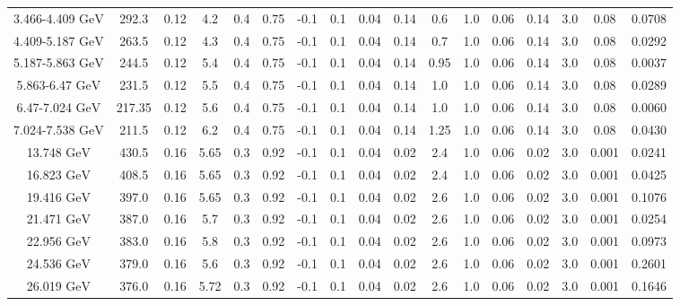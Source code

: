 \documentclass[11pt]{article}
\begin{document}
\begin{table}[htbp]
{\begin{tabular}{ccccccccccccccccc}
				\midrule
				3.466-4.409 ${\textrm{GeV}}$ & 292.3 & 0.12 & 4.2 & 0.4 & 0.75 & -0.1 & 0.1 & 0.04 & 0.14 & 0.6 & 1.0  & 0.06 & 0.14 & 3.0 & 0.08 & 0.0708 \\
				4.409-5.187 ${\textrm{GeV}}$ & 263.5 & 0.12 & 4.3 & 0.4 & 0.75 & -0.1 & 0.1 & 0.04 & 0.14 & 0.7 & 1.0  & 0.06 & 0.14 & 3.0 & 0.08 & 0.0292 \\
				5.187-5.863 ${\textrm{GeV}}$ & 244.5 & 0.12 & 5.4 & 0.4 & 0.75 & -0.1 & 0.1 & 0.04 & 0.14 & 0.95 & 1.0 & 0.06 & 0.14 & 3.0 & 0.08 & 0.0037 \\
				5.863-6.47 ${\textrm{GeV}}$ & 231.5 & 0.12 & 5.5 & 0.4 & 0.75 & -0.1 & 0.1 & 0.04 & 0.14 & 1.0 & 1.0 & 0.06 & 0.14 & 3.0 & 0.08 & 0.0289 \\
				6.47-7.024 ${\textrm{GeV}}$ & 217.35 & 0.12 & 5.6 & 0.4 & 0.75 & -0.1 & 0.1 & 0.04 & 0.14 & 1.0 & 1.0 & 0.06 & 0.14 & 3.0 & 0.08 & 0.0060 \\
				7.024-7.538 ${\textrm{GeV}}$ & 211.5 & 0.12 & 6.2 & 0.4 & 0.75 & -0.1 & 0.1 & 0.04 & 0.14 & 1.25 & 1.0 & 0.06 & 0.14 & 3.0 & 0.08 & 0.0430 \\
				\midrule
				13.748 ${\textrm{GeV}}$ & 430.5 & 0.16 & 5.65 & 0.3 & 0.92 & -0.1 & 0.1 & 0.04 & 0.02 & 2.4 & 1.0 & 0.06 & 0.02 & 3.0 & 0.001 & 0.0241 \\
				16.823 ${\textrm{GeV}}$ & 408.5 & 0.16 & 5.65 & 0.3 & 0.92 & -0.1 & 0.1 & 0.04 & 0.02 & 2.4 & 1.0 & 0.06 & 0.02 & 3.0 & 0.001 & 0.0425 \\
				19.416 ${\textrm{GeV}}$ & 397.0 & 0.16 & 5.65 & 0.3 & 0.92 & -0.1 & 0.1 & 0.04 & 0.02 & 2.6 & 1.0 & 0.06 & 0.02 & 3.0 & 0.001 & 0.1076 \\
				21.471 ${\textrm{GeV}}$ & 387.0 & 0.16 & 5.7 & 0.3 & 0.92 & -0.1 & 0.1 & 0.04 & 0.02 & 2.6 & 1.0 & 0.06 & 0.02 & 3.0 & 0.001 & 0.0254 \\
				22.956 ${\textrm{GeV}}$ & 383.0 & 0.16 & 5.8 & 0.3 & 0.92 & -0.1 & 0.1 & 0.04 & 0.02 & 2.6 & 1.0 & 0.06 & 0.02 & 3.0 & 0.001 & 0.0973 \\
				24.536 ${\textrm{GeV}}$ & 379.0 & 0.16 & 5.6 & 0.3 & 0.92 & -0.1 & 0.1 & 0.04 & 0.02 & 2.6 & 1.0 & 0.06 & 0.02 & 3.0 & 0.001 & 0.2601 \\
				26.019 ${\textrm{GeV}}$ & 376.0 & 0.16 & 5.72 & 0.3 & 0.92 & -0.1 & 0.1 & 0.04 & 0.02 & 2.6 & 1.0 & 0.06 & 0.02 & 3.0 & 0.001 & 0.1646 \\
				\bottomrule
				\bottomrule
			\end{tabular}
}
\end{table}
\end{document}

